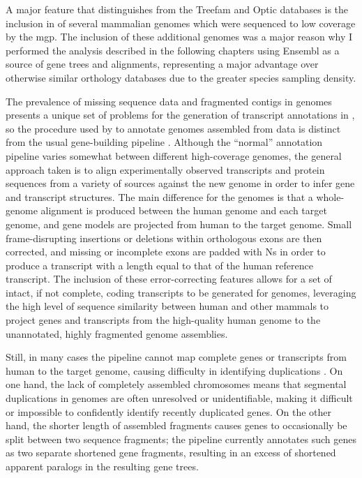 A major feature that distinguishes \cmp from the Treefam and Optic
databases is the inclusion in \cmp of several mammalian genomes which
were sequenced to low coverage by the \ac{mgp}. The inclusion of these
additional genomes was a major reason why I performed the analysis
described in the following chapters using Ensembl as a source of gene
trees and alignments, representing a major advantage over otherwise
similar orthology databases due to the greater species sampling
density. 

The prevalence of missing sequence data and fragmented contigs in \lcv
genomes presents a unique set of problems for the generation of
transcript annotations in \ens, so the procedure used by \cmp to
annotate genomes assembled from \lcv data is distinct from the usual
gene-building pipeline \citep{Hubbard2007}. Although the ``normal''
annotation pipeline varies somewhat between different high-coverage
genomes, the general approach taken is to align experimentally
observed transcripts and protein sequences from a variety of sources
against the new genome in order to infer gene and transcript
structures. The main difference for the \lcv genomes is that a
whole-genome alignment is produced between the human genome and each
\lcv target genome, and gene models are projected from human to the
target genome. Small frame-disrupting insertions or deletions within
orthologous exons are then corrected, and missing or incomplete exons
are padded with Ns in order to produce a transcript with a length
equal to that of the human reference transcript. The inclusion of
these error-correcting features allows for a set of intact, if not
complete, coding transcripts to be generated for \lcv genomes,
leveraging the high level of sequence similarity between human and
other \euth mammals to project genes and transcripts from the
high-quality human genome to the unannotated, highly fragmented \lcv
genome assemblies. 

Still, in many cases the \ens pipeline cannot map complete genes or
transcripts from human to the target genome, causing difficulty in
identifying duplications \citep{Hubbard2007}. On one hand, the lack of
completely assembled chromosomes means that segmental duplications in
\lcv genomes are often unresolved or unidentifiable, making it
difficult or impossible to confidently identify recently duplicated
genes. On the other hand, the shorter length of assembled fragments
causes genes to occasionally be split between two sequence fragments;
the \ens pipeline currently annotates such genes as two separate
shortened gene fragments, resulting in an excess of shortened apparent
paralogs in the resulting gene trees.

